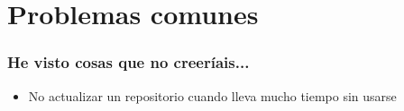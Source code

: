 \section{Problemas comunes}
\frame
{
\frametitle{He visto cosas que no creeríais...}
\begin{itemize}
\item No actualizar un repositorio cuando lleva mucho tiempo sin usarse
\end{itemize}
}

\usebackgroundtemplate{}